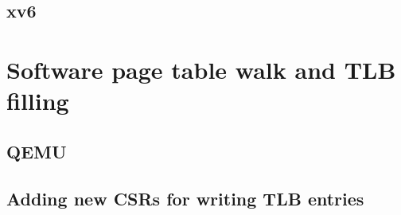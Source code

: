 
\subsection{xv6}





\section{Software page table walk and TLB filling}


\subsection{QEMU}





\subsection{Adding new CSRs for writing TLB entries}

